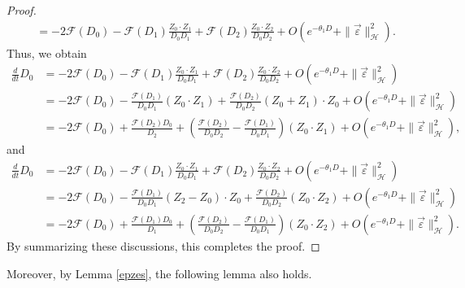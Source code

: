 \documentclass[reqno]{amsart}
\theoremstyle{plain}
\theoremstyle{definition}
\numberwithin{equation}{section}
\newcommand{\1}{\mathbbm{1}}
\begin{document}
\begin{proof}
\begin{align*}
&=-2\mathcal{F}(D_0)-\mathcal{F}(D_1)\frac{Z_0\cdot Z_1}{D_0D_1}+\mathcal{F}(D_2)\frac{Z_0\cdot Z_2}{D_0D_2}+O(e^{-\theta_1 D}+\|\vec{\varepsilon}\|_{\mathcal{H}}^2).
\end{align*}
Thus, we obtain
\begin{align*}
\frac{d}{dt}D_0&=-2\mathcal{F}(D_0)-\mathcal{F}(D_1)\frac{Z_0\cdot Z_1}{D_0D_1}+\mathcal{F}(D_2)\frac{Z_0\cdot Z_2}{D_0D_2}+O(e^{-\theta_1 D}+\|\vec{\varepsilon}\|_{\mathcal{H}}^2)
\\
&=-2\mathcal{F}(D_0)-\frac{\mathcal{F}(D_1)}{D_0D_1}(Z_0\cdot Z_1)+\frac{\mathcal{F}(D_2)}{D_0D_2}(Z_0+Z_1)\cdot Z_0+O(e^{-\theta_1 D}+\|\vec{\varepsilon}\|_{\mathcal{H}}^2)
\\
&=-2\mathcal{F}(D_0)+\frac{\mathcal{F}(D_2)D_0}{D_2}+\left(\frac{\mathcal{F}(D_2)}{D_0D_2}-\frac{\mathcal{F}(D_1)}{D_0D_1}\right)(Z_0\cdot Z_1)+O(e^{-\theta_1 D}+\|\vec{\varepsilon}\|_{\mathcal{H}}^2),
\end{align*}
and
\begin{align*}
\frac{d}{dt}D_0&=-2\mathcal{F}(D_0)-\mathcal{F}(D_1)\frac{Z_0\cdot Z_1}{D_0D_1}+\mathcal{F}(D_2)\frac{Z_0\cdot Z_2}{D_0D_2}+O(e^{-\theta_1 D}+\|\vec{\varepsilon}\|_{\mathcal{H}}^2)
\\
&=-2\mathcal{F}(D_0)-\frac{\mathcal{F}(D_1)}{D_0D_1}(Z_2-Z_0)\cdot Z_0+\frac{\mathcal{F}(D_2)}{D_0D_2}(Z_0\cdot Z_2)+O(e^{-\theta_1 D}+\|\vec{\varepsilon}\|_{\mathcal{H}}^2)
\\
&=-2\mathcal{F}(D_0)+\frac{\mathcal{F}(D_1)D_0}{D_1}+\left(\frac{\mathcal{F}(D_2)}{D_0D_2}-\frac{\mathcal{F}(D_1)}{D_0D_1}\right)(Z_0\cdot Z_2)+O(e^{-\theta_1 D}+\|\vec{\varepsilon}\|_{\mathcal{H}}^2).
\end{align*}
By summarizing these discussions, this completes the proof.
\end{proof}


Moreover, by Lemma \ref{epzes}, the following lemma also holds.
\end{document}
